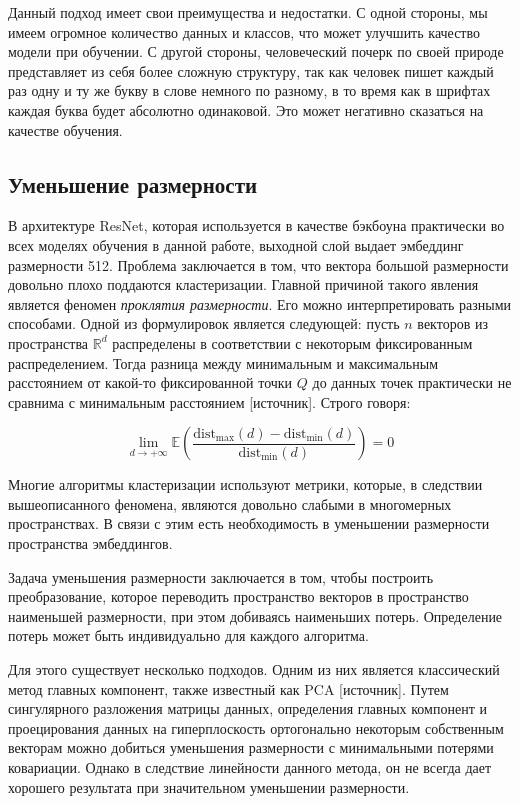 Данный подход имеет свои преимущества и недостатки. С одной стороны, мы имеем огромное количество данных и классов, что может улучшить качество модели при обучении. С другой стороны, человеческий почерк по своей природе представляет из себя более сложную структуру, так как человек пишет каждый раз одну и ту же букву в слове немного по разному, в то время как в шрифтах каждая буква будет абсолютно одинаковой. Это может негативно сказаться на качестве обучения.

\subsection{Уменьшение размерности}

В архитектуре ResNet, которая используется в качестве бэкбоуна практически во всех моделях обучения в данной работе, выходной слой выдает эмбеддинг размерности 512. Проблема заключается в том, что вектора большой размерности довольно плохо поддаются кластеризации. Главной причиной такого явления является феномен \textit{проклятия размерности}. Его можно интерпретировать разными способами. Одной из формулировок является следующей: пусть $n$ векторов из пространства $\mathbb{R}^d$ распределены в соответствии с некоторым фиксированным распределением. Тогда разница между минимальным и максимальным расстоянием от какой-то фиксированной точки $Q$ до данных точек практически не сравнима с минимальным расстоянием [источник]. Строго говоря:

$$
\lim_{d\rightarrow+\infty} \mathbb{E}\left( 
    \frac{\text{dist}_{\text{max}}(d) - \text{dist}_{\text{min}}(d)}{\text{dist}_{\text{min}}(d)}
\right) = 0
$$

\bigskip
Многие алгоритмы кластеризации используют метрики, которые, в следствии вышеописанного феномена, являются довольно слабыми в многомерных пространствах. В связи с этим есть необходимость в уменьшении размерности пространства эмбеддингов.

Задача уменьшения размерности заключается в том, чтобы построить преобразование, которое переводить пространство векторов в пространство наименьшей размерности, при этом добиваясь наименьших потерь. Определение потерь может быть индивидуально для каждого алгоритма. 

Для этого существует несколько подходов. Одним из них является классический метод главных компонент, также известный как PCA [источник]. Путем сингулярного разложения матрицы данных, определения главных компонент и проецирования данных на гиперплоскость ортогонально некоторым собственным векторам можно добиться уменьшения размерности с минимальными потерями ковариации. Однако в следствие линейности данного метода, он не всегда дает хорошего результата при значительном уменьшении размерности.

